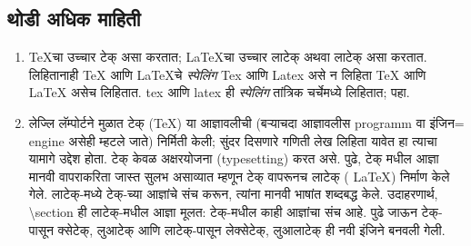 \documentclass[11pt]{article}
\newcommand{\7}{\textbackslash}
\newcommand{\Syn}{\textenglish}
\begin{document}
 \subsection{थोडी अधिक माहिती}
\label{sec:info}

\begin{enumerate}[leftmargin=*]
\item {\Bask \TeX}चा उच्चार टेक् असा करतात; {\Bask \LaTeX}चा
 उच्चार लाटेक् अथवा लाटेक् असा करतात. लिहितानाही {\Bask \TeX} आणि {\Bask
 \LaTeX}चे \textit{ स्पेलिंग} {\Bask Tex} आणि {\Bask Latex} असे न लिहिता
 {\Bask TeX} आणि {\Bask LaTeX} असेच लिहितात. \Syn{tex} आणि
 \Syn{latex} ही \textit{स्पेलिंग} तांत्रिक चर्चेमध्ये लिहितात; \cite[{\Bask Section 1.3}]{ll-book} पहा.

\item लेज्लि लॅम्पोर्टने मुळात टेक् ({\Bask \TeX})
  या
 आज्ञावलीची (बऱ्याचदा आज्ञावलीस programm वा इंजिन={\Bask
 engine} असेही म्हटले जाते)
 निर्मिती केली; सुंदर दिसणारे गणिती लेख लिहिता यावेत हा त्याचा यामागे उद्देश
 होता. टेक् केवळ अक्षरयोजना ({\Bask typesetting}) करत असे. पुढे, टेक् मधील
 आज्ञा मानवी वापराकरिता जास्त सुलभ असाव्यात म्हणून टेक् वापरूनच लाटेक् ({\Bask
 \LaTeX})  निर्माण केले गेले. लाटेक्-मध्ये टेक्-च्या आज्ञांचे संच करून, त्यांना मानवी भाषांत शब्दबद्ध केले. उदाहरणार्थ,
 \Syn{\7section} ही लाटेक्-मधील आज्ञा मूलत: टेक्-मधील काही आज्ञांचा संच आहे. पुढे
 जाऊन टेक्-पासून क्सेटेक्, लुआटेक् आणि लाटेक्-पासून लेक्सेटेक्, लुआलाटेक् ही नवी इंजिने बनवली
 गेली.
 

\end{enumerate}
\end{document}
